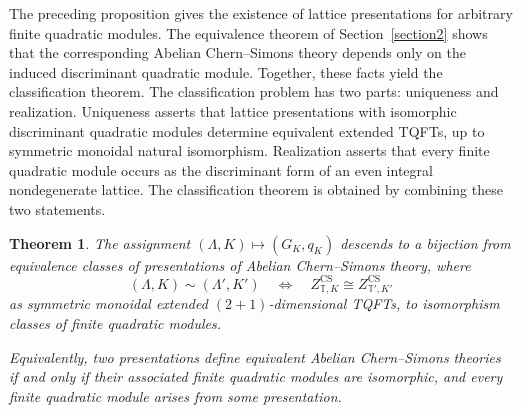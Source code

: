 \documentclass[12pt]{amsart}
\numberwithin{equation}{section}
\newtheorem{theorem}{Theorem}[section]
\begin{document}
The preceding proposition gives the existence of lattice presentations for arbitrary finite quadratic modules. The equivalence theorem of Section~\ref{section2} shows that the corresponding Abelian Chern--Simons theory depends only on the induced discriminant quadratic module. Together, these facts yield the classification theorem. The classification problem has two parts: uniqueness and realization. Uniqueness asserts that lattice presentations with isomorphic discriminant quadratic modules determine equivalent extended TQFTs, up to symmetric monoidal natural isomorphism. Realization asserts that every finite quadratic module occurs as the discriminant form of an even integral nondegenerate lattice. The classification theorem is obtained by combining these two statements.
\begin{theorem}\label{thm:classification-main}
The assignment $(\Lambda,K)\longmapsto (G_K,q_K)$ descends to a bijection from equivalence classes of presentations of  Abelian Chern--Simons theory, where
\[
(\Lambda,K)\sim (\Lambda',K')
\quad\Longleftrightarrow\quad
Z^{\mathrm{CS}}_{\mathbb T,K}\cong Z^{\mathrm{CS}}_{\mathbb T',K'}
\]
as symmetric monoidal extended $(2+1)$-dimensional TQFTs, to isomorphism classes of finite quadratic modules.

Equivalently, two presentations define equivalent  Abelian Chern--Simons theories if and only if their associated finite quadratic modules are isomorphic, and every finite quadratic module arises from some  presentation.
\end{theorem}
\end{document}
